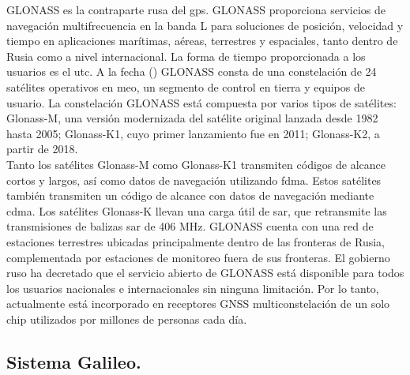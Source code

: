 \begin{justify}
    GLONASS es la contraparte rusa del \gls{gps}. GLONASS proporciona servicios de navegación multifrecuencia en la banda L para soluciones de posición, velocidad y tiempo
    en aplicaciones marítimas, aéreas, terrestres y espaciales, tanto dentro de Rusia como a nivel internacional. La forma de tiempo proporcionada a los usuarios es el \gls{utc}.
    A la fecha () GLONASS consta de una constelación de 24 satélites operativos en \gls{meo}, un segmento de control en tierra y equipos de usuario. La constelación GLONASS
    está compuesta por varios tipos de satélites: Glonass-M, una versión modernizada del satélite original lanzada desde 1982 hasta 2005; Glonass-K1, cuyo primer
    lanzamiento fue en 2011; Glonass-K2, a partir de 2018.\\
    
    Tanto los satélites Glonass-M como Glonass-K1 transmiten códigos de alcance cortos y largos, así como datos de navegación utilizando \gls{fdma}. Estos satélites también
    transmiten un código de alcance con datos de navegación mediante \gls{cdma}. Los satélites Glonass-K llevan una carga útil de \gls{sar}, que retransmite las
    transmisiones de balizas \gls{sar} de 406 MHz. GLONASS cuenta con una red de estaciones terrestres
    ubicadas principalmente dentro de las fronteras de Rusia, complementada por estaciones de monitoreo fuera de sus fronteras. El gobierno ruso ha decretado que el servicio abierto
    de GLONASS está disponible para todos los usuarios nacionales e internacionales sin ninguna limitación. Por lo tanto, actualmente está incorporado en receptores GNSS
    multiconstelación de un solo chip utilizados por millones de personas cada día.
\end{justify}

\subsection*{\fontsize{12}{18}\selectfont Sistema Galileo.}

